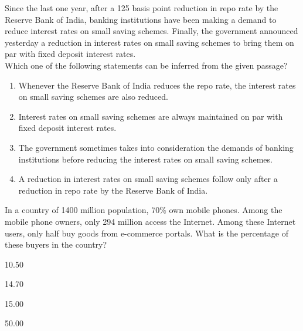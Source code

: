     \item Since the last one year, after a 125 basis point reduction in repo rate by the Reserve Bank of India, banking institutions have been making a demand to reduce interest rates on small saving schemes. Finally, the government announced yesterday a reduction in interest rates on small saving schemes to bring them on par with fixed deposit interest rates.\\
    Which one of the following statements can be inferred from the given passage?\\
    \begin{enumerate}
        \item Whenever the Reserve Bank of India reduces the repo rate, the interest rates on small saving schemes are also reduced.
        \item Interest rates on small saving schemes are always maintained on par with fixed deposit interest rates.
        \item The government sometimes takes into consideration the demands of banking institutions before reducing the interest rates on small saving schemes.
        \item A reduction in interest rates on small saving schemes follow only after a reduction in repo rate by the Reserve Bank of India.
    \end{enumerate}
    \bigskip

    \item In a country of 1400 million population, 70\% own mobile phones. Among the mobile phone owners, only 294 million access the Internet. Among these Internet users, only half buy goods from e-commerce portals. What is the percentage of these buyers in the country?\\
    \begin{enumerate}
    \begin{multicols}{4}
        \item 10.50
        \item 14.70
        \item 15.00
        \item 50.00
        \end{multicols}
    \end{enumerate}
    \bigskip

